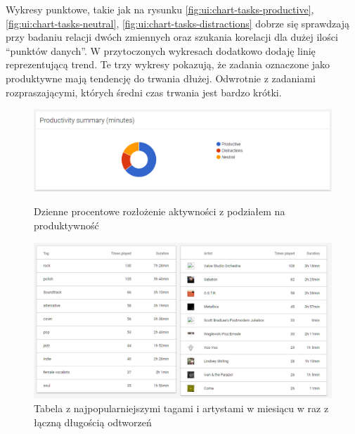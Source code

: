 \documentclass[openright]{xmgr}
\begin{document}
    Wykresy punktowe, takie jak na rysunku \ref{fig:ui:chart-tasks-productive}, \ref{fig:ui:chart-tasks-neutral}, \ref{fig:ui:chart-tasks-distractions}
    dobrze się sprawdzają przy badaniu relacji dwóch zmiennych oraz szukania korelacji dla dużej ilości ``punktów danych''.
    W przytoczonych wykresach dodatkowo dodaję linię reprezentującą trend.
    Te trzy wykresy pokazują, że zadania oznaczone jako produktywne mają tendencję do trwania dłużej.
    Odwrotnie z zadaniami rozpraszającymi, których średni czas trwania jest bardzo krótki.

    \begin{figure}
        \includegraphics[width=\linewidth]{fig/ui/chart-productivity-summary.png}
        \caption{Dzienne procentowe rozłożenie aktywności z podziałem na produktywność}
        \label{fig:ui:chart-productivity-summary}

        \includegraphics[width=\linewidth]{fig/ui/table-popular-music-tags.png}
        \caption{Tabela z najpopularniejszymi tagami i artystami w miesiącu w raz z łączną długością odtworzeń}
        \label{fig:ui:table-popular-music-tags}
    \end{figure}
\end{document}
